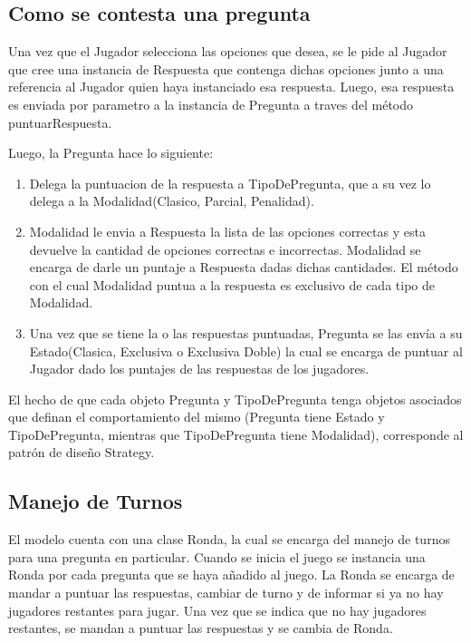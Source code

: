 \documentclass[titlepage,a4paper]{article}
\begin{document}
\subsection{Como se contesta una pregunta}

Una vez que el Jugador selecciona las opciones que desea, se le pide al Jugador que cree una instancia de Respuesta que contenga dichas opciones junto a una referencia al Jugador quien haya instanciado esa respuesta. Luego, esa respuesta es enviada por parametro a la instancia de Pregunta a traves del método puntuarRespuesta.

Luego, la Pregunta hace lo siguiente:

\begin{enumerate}
\item Delega la puntuacion de la respuesta a TipoDePregunta, que a su vez lo delega a la Modalidad(Clasico, Parcial, Penalidad).
\item Modalidad le envia a Respuesta la lista de las opciones correctas y esta devuelve la cantidad de opciones correctas e incorrectas. Modalidad se encarga de darle un puntaje a Respuesta dadas dichas cantidades. El método con el cual Modalidad puntua a la respuesta es exclusivo de cada tipo de Modalidad.
\item Una vez que se tiene la o las respuestas puntuadas, Pregunta se las envía a su Estado(Clasica, Exclusiva o Exclusiva Doble) la cual se encarga de puntuar al Jugador dado los puntajes de las respuestas de los jugadores.
\end{enumerate}

El hecho de que cada objeto Pregunta y TipoDePregunta tenga objetos asociados que definan el comportamiento del mismo (Pregunta tiene Estado y TipoDePregunta, mientras que TipoDePregunta tiene Modalidad), corresponde al patrón de diseño Strategy.

\subsection{Manejo de Turnos}

El modelo cuenta con una clase Ronda, la cual se encarga del manejo de turnos para una pregunta en particular. Cuando se inicia el juego se instancia una Ronda por cada pregunta que se haya añadido al juego. La Ronda se encarga de mandar a puntuar las respuestas, cambiar de turno y de informar si ya no hay jugadores restantes para jugar. Una vez que se indica que no hay jugadores restantes, se mandan a puntuar las respuestas y se cambia de Ronda.
\end{document}
